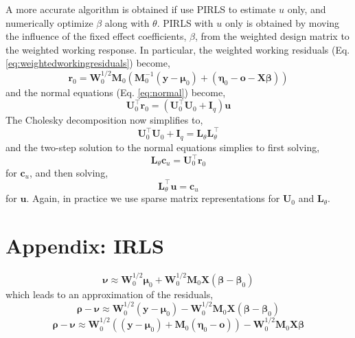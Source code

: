 \documentclass{jss}
\begin{document}
A more accurate algorithm is obtained if use PIRLS to estimate $u$
only, and numerically optimize $\beta$ along with $\theta$. PIRLS
with $u$ only is obtained by moving the influence of the fixed
effect coefficients, $\beta$, from the weighted design matrix to the weighted
working response. In particular, the weighted working residuals
(Eq. \ref{eq:weightedworkingresiduals}) become,
\begin{equation}
\bm r_0 = \bm W_0^{1/2} \bm M_0 (\bm M_0^{-1} (\bm y - \bm\mu_0) +
(\bm\eta_0 - \bm o - \bm X \bm\beta))
\end{equation}
and the normal equations (Eq. \ref{eq:normal}) become,
\begin{equation}
\bm U_0^\top \bm r_0 = 
(\bm U_0^\top \bm U_0 + \bm I_q ) \bm u
\end{equation}
The Cholesky decomposition now simplifies to,
\begin{equation}
\bm U_0^\top \bm U_0 + \bm I_q =
\bm L_\theta \bm L^\top_\theta 
\end{equation}
and the two-step solution to the normal equations simplies to first solving,
\begin{equation}
\bm L_\theta
\bm c_u = 
\bm U_0^\top \bm r_0
\end{equation}
for $\bm c_u$, and then solving,
\begin{equation}
\bm L^\top_\theta
\bm u= 
\bm c_u
\end{equation}
for $\bm u$. Again, in practice we use sparse matrix
representations for $\bm U_0$ and $\bm L_\theta$.

\section{Appendix: IRLS}

\begin{equation}
\bm\nu \approx
\bm W_0^{1/2}\bm \mu_0 + 
 \bm W_0^{1/2}\bm M_0 \bm X (\bm\beta - \bm\beta_0 )
\end{equation}
which leads to an approximation of the residuals,
\begin{equation}
\bm\rho - \bm\nu \approx
\bm W_0^{1/2}(\bm y - \bm\mu_0) - 
\bm W_0^{1/2}\bm M_0 \bm X 
(\bm\beta - \bm\beta_0)
\end{equation}
\begin{equation}
\bm\rho - \bm\nu \approx
\bm W_0^{1/2}((\bm y - \bm\mu_0) + 
\bm M_0 (\bm\eta_0 - \bm o)) - 
\bm W_0^{1/2}\bm M_0 \bm X \bm\beta
\end{equation}


\end{document}
